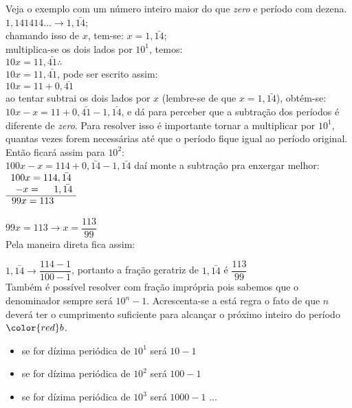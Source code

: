 Veja o exemplo com um número inteiro maior do que \textit{zero} e período com dezena.\\
	
$ 1,141414 \hdots \longrightarrow 1,\bar{14} $; \\
	chamando isso de $ x $, tem-se: $ x = 1,\bar{14} $; \\
	multiplica-se os dois lados por $ 10^1 $, temos: \\
	$ 10x = 11,\bar{41} \therefore $ \\
	$ 10x = 11,\bar{41} $, pode ser escrito assim: \\ $ 10x = 11 + 0,\bar{41} $\\
	ao tentar subtrai os dois lados por $ x $ (lembre-se de que $ x = 1,\bar{14} $), obtém-se: \\ $ 10x - x = 11 + 0,\bar{41} - 1,\bar{14} $, e dá para perceber que a subtração dos períodos é diferente de \textit{zero}. Para resolver isso é importante tornar a multiplicar por $ 10^1 $, quantas vezes forem necessárias até que o período fique igual ao período original. Então ficará assim para $ 10^2 $: \\
	$ 100x - x = 114 + 0,\bar{14} - 1,\bar{14} $ daí monte a subtração pra enxergar melhor: \\
	$
		\begin{array}{r l}
		\multicolumn{2}{r}{100x = 114,\bar{14}} \\ 
		\multicolumn{1}{r}{\;\:-x = \;\;\:\;\; 1,\bar{14}} \\ \cline{1-2}
		\multicolumn{2}{r}{99x = 113 \;\;\:\;\;\;\:} \\
		\end{array}
	$
		
	$ 99x = 113 \longrightarrow x = \dfrac{113}{99} $ \\
	
	Pela maneira direta fica assim:
	
	$ 1,\bar{14} \longrightarrow \dfrac{114 - 1}{100-1} $, portanto a fração geratriz de $ 1,\bar{14} $ é $ \dfrac{113}{99} $ \\
	
	Também é possível resolver com fração imprópria pois sabemos que o denominador sempre será $ 10^n -1 $. Acrescenta-se a está regra o fato de que $ n $ deverá ter o cumprimento suficiente para alcançar o próximo inteiro do período $ \color{red}b $.
	
	\begin{itemize}
		\item se for dízima periódica de $ 10^1 $ será $ 10 - 1 $
		\item se for dízima periódica de $ 10^2 $ será $ 100 - 1 $
		\item se for dízima periódica de $ 10^3 $ será $ 1000 - 1 $ ...
	\end{itemize}
	
